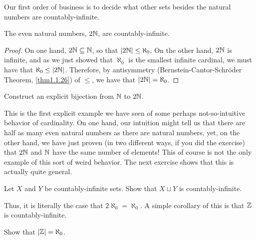 Our first order of business is to decide what other sets besides the natural numbers are countably-infinite.
\begin{prp}
The even natural numbers, $2\mathbb{N}$, are countably-infinite.
\begin{proof}
On one hand, $2\mathbb{N} \subseteq \mathbb{N}$, so that $|2\mathbb{N} |\leq \aleph _0$.  On the other hand, $2\mathbb{N}$ is infinite, and as we just showed that $\aleph _0$ is the smallest infinite cardinal, we must have that $\aleph _0\leq |2\mathbb{N} |$.  Therefore, by antisymmetry (Bernstein-Cantor-Schr\"{o}der Theorem, \cref{thm1.1.26}) of $\leq$, we have that $|2\mathbb{N} |=\aleph _0$.
\end{proof}
\end{prp}
\begin{exr}
Construct an explicit bijection from $\mathbb{N}$ to $2\mathbb{N}$.
\end{exr}
This is the first explicit example we have seen of some perhaps not-so-intuitive behavior of cardinality.  On one hand, our intuition might tell us that there are half as many even natural numbers as there are natural numbers, yet, on the other hand, we have just proven (in two different ways, if you did the exercise) that $2\mathbb{N}$ and $\mathbb{N}$ have the same number of elements!  This of course is not the only example of this sort of weird behavior.  The next exercise shows that this is actually quite general.
\begin{exr}
Let $X$ and $Y$ be countably-infinite sets.  Show that $X\sqcup Y$ is countably-infinite.
\end{exr}
Thus, it is literally the case that $2\aleph _0=\aleph _0$.  A simple corollary of this is that $\mathbb{Z}$ is countably-infinite.
\begin{exr}
Show that $|\mathbb{Z} |=\aleph _0$.
\end{exr}

